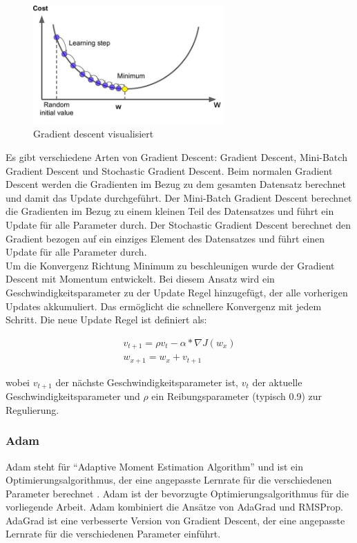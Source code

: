 \begin{figure}[H]
  \centering
  \includegraphics[width=0.65\textwidth]{resources/cnn/gradient-descent.jpg}
  \caption{
    Gradient descent visualisiert
    \cite{gradient-descent}
  }
  \label{image:gradient-descent}
\end{figure}

Es gibt verschiedene Arten von Gradient Descent: Gradient Descent, Mini-Batch Gradient Descent und Stochastic Gradient Descent. 
Beim normalen Gradient Descent
werden die Gradienten im Bezug zu dem gesamten Datensatz berechnet und damit das Update durchgeführt. Der Mini-Batch Gradient Descent berechnet 
die Gradienten im Bezug zu einem kleinen Teil des Datensatzes und führt ein Update für alle Parameter durch. Der Stochastic Gradient Descent 
berechnet den Gradient bezogen auf ein einziges Element des Datensatzes und führt einen Update für alle Parameter durch.
\\
Um die Konvergenz Richtung Minimum zu beschleunigen wurde der Gradient Descent mit Momentum entwickelt. Bei diesem Ansatz wird ein
Geschwindigkeitsparameter zu der Update Regel hinzugefügt, der alle vorherigen Updates akkumuliert. 
Das ermöglicht die schnellere Konvergenz mit jedem Schritt. Die neue Update Regel ist definiert als:

\begin{equation}
  \begin{gathered}
    v_{t+1} = \rho v_t - \alpha * \nabla J(w_x) \\
    w_{x+1} = w_x + v_{t+1}
  \end{gathered}
\end{equation}

wobei $v_{t+1}$ der nächste Geschwindigkeitsparameter ist, $v_t$ der aktuelle Geschwindigkeitsparameter und $\rho$ ein Reibungsparameter 
(typisch 0.9) zur Regulierung.

\subsubsection{Adam}
Adam steht für ``Adaptive Moment Estimation Algorithm'' und ist ein Optimierungsalgorithmus, der eine angepasste Lernrate für die verschiedenen
Parameter berechnet \cite{kingma2014adam}. Adam ist der bevorzugte Optimierungsalgorithmus für die vorliegende Arbeit. 
Adam kombiniert die Ansätze von AdaGrad \cite{duchi2011adaptive} und RMSProp. AdaGrad ist eine 
verbesserte Version von Gradient Descent, der eine angepasste Lernrate für die verschiedenen Parameter einführt. 

